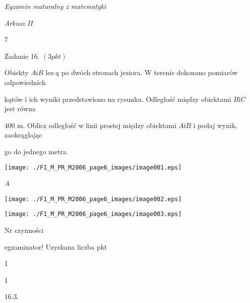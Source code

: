 \documentclass[a4paper,12pt]{article}
\begin{document}
{\it Egzamin maturalny z matematyki}

{\it Arkusz II}

7

Zadanie 16. $(3pkt)$

Obiekty $A\mathrm{i}B$ lez$\cdot$ą po dwóch stronach jeziora. $\mathrm{W}$ terenie dokonano pomiarów odpowiednich

kątów i ich wyniki przedstawiono na rysunku. Odległość między obiektami $B\mathrm{i}C$ jest równa

400 $\mathrm{m}$. Oblicz odległość w linii prostej między obiektami $A\mathrm{i}B$ i podaj wynik, zaokrąglając

go do jednego metra.
\begin{center}
\texttt{[image: ./F1\_M\_PR\_M2006\_page6\_images/image001.eps]}
\end{center}
{\it A}
\begin{center}
\texttt{[image: ./F1\_M\_PR\_M2006\_page6\_images/image002.eps]}

\texttt{[image: ./F1\_M\_PR\_M2006\_page6\_images/image003.eps]}
\end{center}
Nr czynności

egzaminator! Uzyskana liczba pkt

1

1

16.3.
\end{document}
